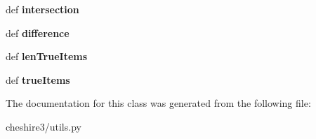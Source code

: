 \begin{DoxyCompactItemize}
\item 
\hypertarget{classcheshire3_1_1utils_1_1_simple_bitfield_a34e3397c721be8a006bf4e8ff9a7932a}{def {\bfseries intersection}}\label{classcheshire3_1_1utils_1_1_simple_bitfield_a34e3397c721be8a006bf4e8ff9a7932a}

\item 
\hypertarget{classcheshire3_1_1utils_1_1_simple_bitfield_a74d47d096f7aaa63eb92526cee244675}{def {\bfseries difference}}\label{classcheshire3_1_1utils_1_1_simple_bitfield_a74d47d096f7aaa63eb92526cee244675}

\item 
\hypertarget{classcheshire3_1_1utils_1_1_simple_bitfield_a7c3c10442f3d70527cda826a854f18e0}{def {\bfseries len\-True\-Items}}\label{classcheshire3_1_1utils_1_1_simple_bitfield_a7c3c10442f3d70527cda826a854f18e0}

\item 
\hypertarget{classcheshire3_1_1utils_1_1_simple_bitfield_a645d5bbc65111405b17a275376a97535}{def {\bfseries true\-Items}}\label{classcheshire3_1_1utils_1_1_simple_bitfield_a645d5bbc65111405b17a275376a97535}

\end{DoxyCompactItemize}


The documentation for this class was generated from the following file\-:\begin{DoxyCompactItemize}
\item 
cheshire3/utils.\-py\end{DoxyCompactItemize}
